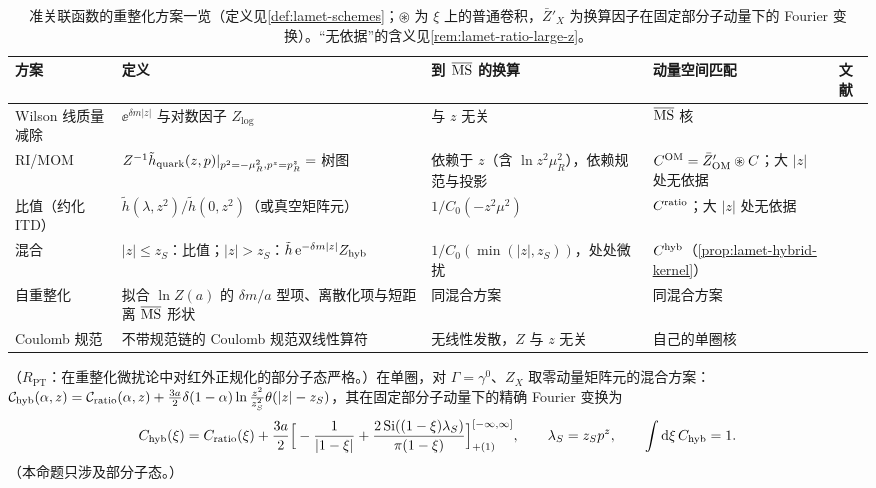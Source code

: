 \begin{table}[htbp]
\centering
\footnotesize
\renewcommand{\arraystretch}{1.12}
\begin{tabularx}{\textwidth}{@{}>{\raggedright\arraybackslash}p{1.8cm}>{\raggedright\arraybackslash}X>{\raggedright\arraybackslash}p{2.75cm}>{\raggedright\arraybackslash}p{2.6cm}>{\raggedright\arraybackslash}p{2.1cm}@{}}
\toprule
方案 & 定义 & 到 $\overline{\mathrm{MS}}$ 的换算 & 动量空间匹配 & 文献 \\
\midrule
Wilson 线质量减除 & $\ee^{\delta m|z|}$ 与对数因子 $Z_{\log}$ & 与 $z$ 无关 & $\overline{\mathrm{MS}}$ 核 & \cite{Chen:2016fxx,Ishikawa:2016znu,Green:2017xeu} \\
RI/MOM & $Z^{-1}\tilde h_{\rm quark}(z,p)|_{p^2=-\mu_R^2,p^z=p^z_R}=$ 树图 & 依赖于 $z$（含 $\ln z^2\mu_R^2$），依赖规范与投影 & $C^{\rm OM}=\bar Z'_{\rm OM}\circledast C$；大 $|z|$ 处无依据 & \cite{Constantinou:2017sej,Stewart:2017tvs,Alexandrou:2017huk,Chen:2017mzz,LatticeParton:2018gjr} \\
比值（约化 ITD） & $\tilde h(\lambda,z^2)/\tilde h(0,z^2)$（或真空矩阵元） & $1/C_0(-z^2\mu^2)$ & $C^{\rm ratio}$；大 $|z|$ 处无依据 & \cite{Radyushkin2017,Orginos:2017kos,Braun:2018brg} \\
混合 & $|z|\le z_S$：比值；$|z|>z_S$：$\tilde h\,\mathrm{e}^{-\delta m|z|}Z_{\rm hyb}$ & $1/C_0(\min(|z|,z_S))$，处处微扰 & $C^{\rm hyb}$（\cref{prop:lamet-hybrid-kernel}） & \cite{Ji:2020brr} \\
自重整化 & 拟合 $\ln Z(a)$ 的 $\delta m/a$ 型项、离散化项与短距离 $\overline{\mathrm{MS}}$ 形状 & 同混合方案 & 同混合方案 & \cite{LatticePartonLPC:2021gpi} \\
Coulomb 规范 & 不带规范链的 Coulomb 规范双线性算符 & 无线性发散，$Z$ 与 $z$ 无关 & 自己的单圈核 & \cite{Gao:2023lny,Zhao:2023ptv} \\
\bottomrule
\end{tabularx}
\caption{准关联函数的重整化方案一览（定义见\cref{def:lamet-schemes}；$\circledast$ 为 $\xi$ 上的普通卷积，$\bar Z'_X$ 为换算因子在固定部分子动量下的 Fourier 变换）。“无依据”的含义见\cref{rem:lamet-ratio-large-z}。}
\label{tab:lamet-schemes}
\end{table}

\begin{proposition}\label{prop:lamet-hybrid-kernel}
（$R_{\mathrm{PT}}$：在重整化微扰论中对红外正规化的部分子态严格。）在单圈，对 $\Gamma=\gamma^0$、$Z_X$ 取零动量矩阵元的混合方案：$\mathcal C_{\rm hyb}(\alpha,z)=\mathcal C_{\rm ratio}(\alpha,z)+\frac{3a}2\delta(1-\alpha)\ln\frac{z^2}{z_S^2}\theta(|z|-z_S)$，其在固定部分子动量下的精确 Fourier 变换为
\begin{equation}\label{eq:lamet-hybrid-kernel}
C_{\rm hyb}(\xi)=C_{\rm ratio}(\xi)+\frac{3a}2\Big[-\frac1{|1-\xi|}+\frac{2\,{\rm Si}((1-\xi)\lambda_S)}{\pi(1-\xi)}\Big]^{[-\infty,\infty]}_{+(1)},\qquad\lambda_S=z_Sp^z,\qquad\int\mathrm{d}\xi\,C_{\rm hyb}=1 .
\end{equation}%
（本命题只涉及部分子态。）
\end{proposition}

